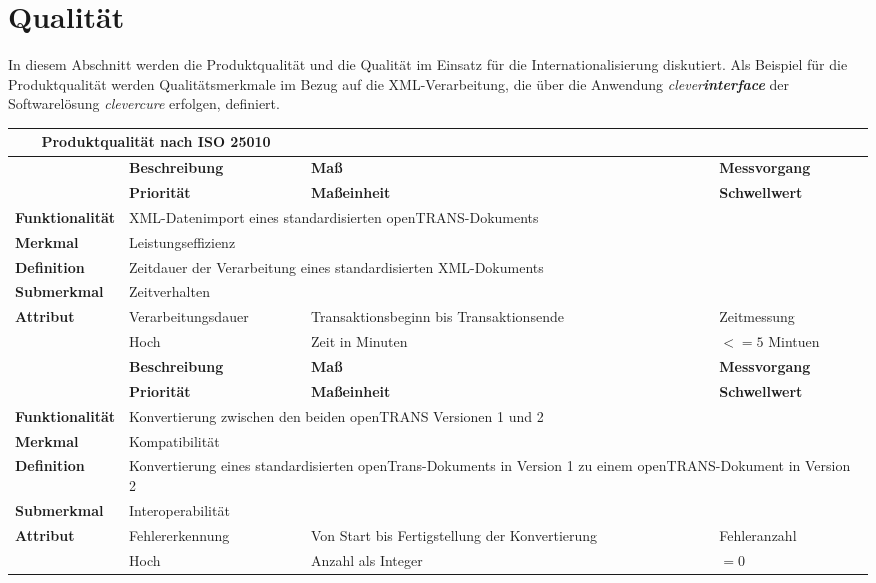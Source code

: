 \section{Qualität}
\label{sec:quality}
In diesem Abschnitt werden die Produktqualität und die Qualität im Einsatz für die Internationalisierung diskutiert.
\newline
\newline
Als Beispiel für die Produktqualität werden Qualitätsmerkmale im Bezug auf die XML-Verarbeitung, die über die Anwendung \emph{clever\textbf{interface}} der Softwarelösung \emph{clevercure} erfolgen, definiert.
\newline
\newline
\bgroup
\def\arraystretch{1.5}%
\begin{tabularx}{\textwidth}{ p{70pt} | X | X | X }
	\multicolumn{2}{c}{\textbf{Produktqualität nach ISO 25010}} \\ \hline
	& \textbf{Beschreibung} & \textbf{Maß} & \textbf{Messvorgang} \\ \hline
	& \textbf{Priorität} & \textbf{Maßeinheit} & \textbf{Schwellwert} \\ \hline
	\textbf{Funktionalität} & \multicolumn{3}{p{300pt}}{XML-Datenimport eines standardisierten openTRANS-Dokuments} \\ \hline
	\textbf{Merkmal} & \multicolumn{3}{X}{Leistungseffizienz} \\ \hline
	\textbf{Definition} & \multicolumn{3}{p{380pt}}{Zeitdauer der Verarbeitung eines standardisierten XML-Dokuments} \\ \hline
	\textbf{Submerkmal} & \multicolumn{3}{X}{Zeitverhalten} \\ \hline 
	\textbf{Attribut} & Verarbeitungsdauer & Transaktionsbeginn bis Transaktionsende & Zeitmessung  \\ \hline
	               & Hoch               & Zeit in Minuten & $<= 5$ Mintuen  \\ 
    \hline 
    \hline 
	& \textbf{Beschreibung} & \textbf{Maß} & \textbf{Messvorgang} \\ \hline
	& \textbf{Priorität} & \textbf{Maßeinheit} & \textbf{Schwellwert} \\ \hline
	\textbf{Funktionalität} & \multicolumn{3}{p{300pt}}{Konvertierung zwischen den beiden openTRANS Versionen 1 und 2} \\ \hline
	\textbf{Merkmal} & \multicolumn{3}{X}{Kompatibilität} \\ \hline
	\textbf{Definition} & \multicolumn{3}{p{380pt}}{Konvertierung eines standardisierten openTrans-Dokuments in Version 1 zu einem openTRANS-Dokument in Version 2} \\ \hline
	\textbf{Submerkmal} & \multicolumn{3}{X}{Interoperabilität} \\ \hline 
	\textbf{Attribut} & Fehlererkennung & Von Start bis Fertigstellung der Konvertierung  & Fehleranzahl  \\ \hline
	& Hoch               & Anzahl als Integer & $= 0$  \\ \hline
\end{tabularx}
